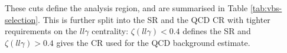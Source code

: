 These cuts define the analysis region, and are summarised in Table
\ref{tab:vbs-selection}.  This is further split into the \ac{SR} and the
\ac{QCD} \ac{CR} with tighter requirements on the $ll\gamma$ centrality:
$\zeta(ll\gamma) < 0.4$ defines the \ac{SR} and $\zeta(ll\gamma) > 0.4$ gives
the \ac{CR} used for the \ac{QCD} \Zy background estimate.
